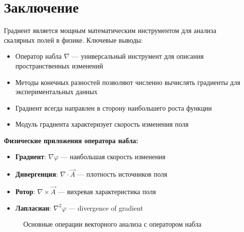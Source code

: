 \documentclass[12pt]{article}
\begin{document}
	\section*{Заключение}
	
	Градиент является мощным математическим инструментом для анализа скалярных полей в физике. Ключевые выводы:
	
	\begin{itemize}
		\item Оператор набла $\nabla$ — универсальный инструмент для описания пространственных изменений
		\item Методы конечных разностей позволяют численно вычислять градиенты для экспериментальных данных
		\item Градиент всегда направлен в сторону наибольшего роста функции
		\item Модуль градиента характеризует скорость изменения поля
	\end{itemize}
	
	\textbf{Физические приложения оператора набла:}
	\begin{itemize}
		\item \textbf{Градиент}: $\nabla\varphi$ — наибольшая скорость изменения
		\item \textbf{Дивергенция}: $\nabla\cdot\vec{A}$ — плотность источников поля  
		\item \textbf{Ротор}: $\nabla\times\vec{A}$ — вихревая характеристика поля
		\item \textbf{Лапласиан}: $\nabla^2\varphi$ — divergence of gradient
	\end{itemize}
	
	\begin{figure}[H]
		\centering
		\caption{Основные операции векторного анализа с оператором набла}
	\end{figure}
	
\end{document}
